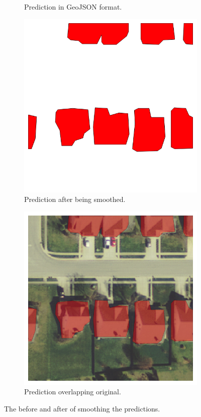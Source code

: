 \documentclass[acmtog, authorversion]{acmart}
\begin{document}
\begin{figure}
\begin{subfigure}[h]{0.24\textwidth}
    \caption{Prediction in GeoJSON format.}
    \label{fig:2}
  \end{subfigure}
  \begin{subfigure}[h]{0.24\textwidth}
    \includegraphics[width=\textwidth]{Images/0005_0028_smooth.png}
    \caption{Prediction after being smoothed.}
    \label{fig:3}
  \end{subfigure}
  \begin{subfigure}[h]{0.24\textwidth}
    \includegraphics[width=\textwidth]{Images/0005_0028_overlap.png}
    \caption{Prediction overlapping original.}
    \label{fig:4}
  \end{subfigure}
  \caption{The before and after of smoothing the predictions.}
  \label{fig:multi} 
\end{figure}
\end{document}
